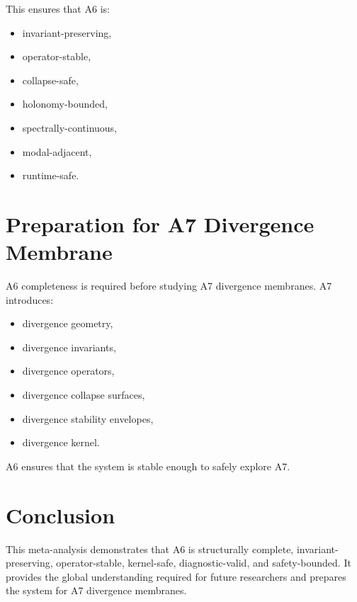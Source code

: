\documentclass[11pt]{article}
\begin{document}
This ensures that A6 is:
\begin{itemize}
  \item invariant-preserving,
  \item operator-stable,
  \item collapse-safe,
  \item holonomy-bounded,
  \item spectrally-continuous,
  \item modal-adjacent,
  \item runtime-safe.
\end{itemize}

\section{Preparation for A7 Divergence Membrane}
A6 completeness is required before studying A7 divergence membranes. A7
introduces:
\begin{itemize}
  \item divergence geometry,
  \item divergence invariants,
  \item divergence operators,
  \item divergence collapse surfaces,
  \item divergence stability envelopes,
  \item divergence kernel.
\end{itemize}

A6 ensures that the system is stable enough to safely explore A7.

\section*{Conclusion}
This meta-analysis demonstrates that A6 is structurally complete, invariant-
preserving, operator-stable, kernel-safe, diagnostic-valid, and safety-bounded.
It provides the global understanding required for future researchers and
prepares the system for A7 divergence membranes.
\end{document}

